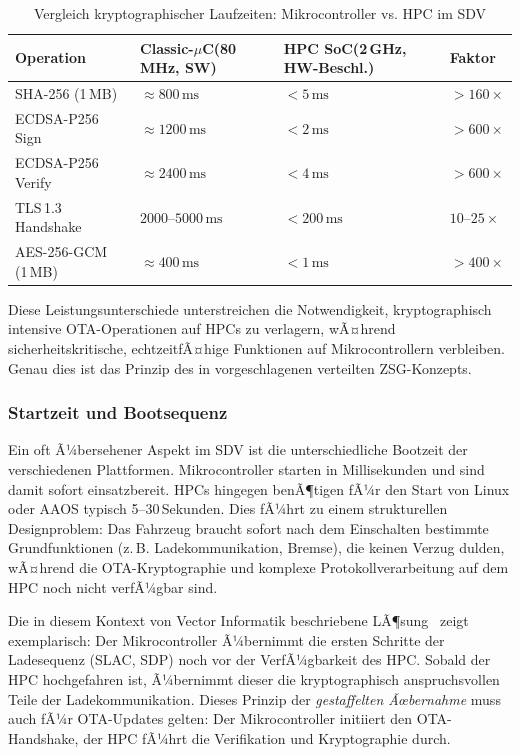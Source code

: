 ﻿\documentclass[12pt,a4paper,twoside]{article}
\begin{document}
\begin{table}[htbp]
  \centering
  \caption{Vergleich kryptographischer Laufzeiten: Mikrocontroller vs. HPC im SDV}
  \label{tab:crypto_perf}
  \begin{tabularx}{\textwidth}{lXXX}
    \toprule
    \textbf{Operation} & \textbf{Classic-$\mu$C\newline(80\,MHz, SW)} &
      \textbf{HPC SoC\newline(2\,GHz, HW-Beschl.)} & \textbf{Faktor} \\
    \midrule
    SHA-256 (1\,MB) & $\approx 800\,\text{ms}$ & $<5\,\text{ms}$ & $>160\times$ \\
    ECDSA-P256 Sign & $\approx 1200\,\text{ms}$ & $<2\,\text{ms}$ & $>600\times$ \\
    ECDSA-P256 Verify & $\approx 2400\,\text{ms}$ & $<4\,\text{ms}$ & $>600\times$ \\
    TLS\,1.3 Handshake & $2000$--$5000\,\text{ms}$ & $<200\,\text{ms}$ & $10$--$25\times$ \\
    AES-256-GCM (1\,MB) & $\approx 400\,\text{ms}$ & $<1\,\text{ms}$ & $>400\times$ \\
    \bottomrule
  \end{tabularx}
\end{table}

Diese Leistungsunterschiede unterstreichen die Notwendigkeit, kryptographisch
intensive OTA-Operationen auf HPCs zu verlagern, wÃ¤hrend sicherheitskritische,
echtzeitfÃ¤hige Funktionen auf Mikrocontrollern verbleiben. Genau dies ist das
Prinzip des in  vorgeschlagenen verteilten ZSG-Konzepts.

\subsubsection{Startzeit und Bootsequenz}

Ein oft Ã¼bersehener Aspekt im SDV ist die unterschiedliche Bootzeit der
verschiedenen Plattformen. Mikrocontroller starten in Millisekunden und sind
damit sofort einsatzbereit. HPCs hingegen benÃ¶tigen fÃ¼r den Start von Linux
oder AAOS typisch 5--30\,Sekunden. Dies fÃ¼hrt zu einem strukturellen Designproblem:
Das Fahrzeug braucht sofort nach dem Einschalten bestimmte Grundfunktionen
(z.\,B. Ladekommunikation, Bremse), die keinen Verzug dulden, wÃ¤hrend die
OTA-Kryptographie und komplexe Protokollverarbeitung auf dem HPC noch nicht
verfÃ¼gbar sind.

Die in diesem Kontext von Vector Informatik beschriebene LÃ¶sung~\cite{schneider2026ladekomm}
zeigt exemplarisch: Der Mikrocontroller Ã¼bernimmt die ersten Schritte der
Ladesequenz (SLAC, SDP) noch vor der VerfÃ¼gbarkeit des HPC. Sobald der HPC
hochgefahren ist, Ã¼bernimmt dieser die kryptographisch anspruchsvollen Teile
der Ladekommunikation. Dieses Prinzip der \emph{gestaffelten Ãœbernahme} muss
auch fÃ¼r OTA-Updates gelten: Der Mikrocontroller initiiert den OTA-Handshake,
der HPC fÃ¼hrt die Verifikation und Kryptographie durch.
\end{document}
